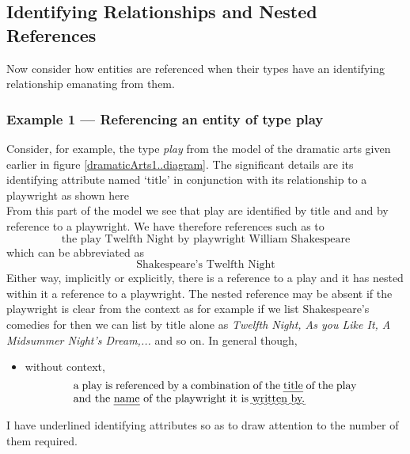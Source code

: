 \subsection{Identifying Relationships and Nested References}
\mynote
Now consider how entities are referenced when their types have an identifying relationship  emanating from them. 

\subsubsection*{Example 1 --- Referencing an entity of type play}
Consider, for example, the type \textit{play} from the model of the dramatic arts given earlier in figure \ref{dramaticArts1..diagram}. The significant details are its identifying attribute named `title' 
in conjunction with its relationship to a playwright
as shown here 
\begin{equation*}

\end{equation*}
From this part of the model we see that play are identified by title and
and by reference to a playwright.
\mynote
We have therefore references such as to
\begin{equation}
\mbox{the play Twelfth Night by playwright William Shakespeare}
\end{equation}
which can be abbreviated as
\begin{equation}
\mbox{Shakespeare's Twelfth Night}
\end{equation}
Either way, implicitly or explicitly, there is a reference to a play and it has 
nested within it a reference to a playwright.
The nested reference may be absent if the playwright is clear from the context as for example if we list Shakespeare's comedies for then we can list by title alone as \textit{Twelfth Night, As you Like It,
A Midsummer Night's Dream,...} and so on.
In general though,
\begin{itemize} 
\item without context, 
\begin{equation} 
\label{absolutePlayReferencing}
\text{\parbox{9cm}{a  play 
is referenced by a combination of the \uline{title} of the play and the \uline{name} of the playwright it is \uwave{written by.}}}
\end{equation}
\end{itemize}
I have underlined  identifying attributes so as to draw attention to the number of them required.
